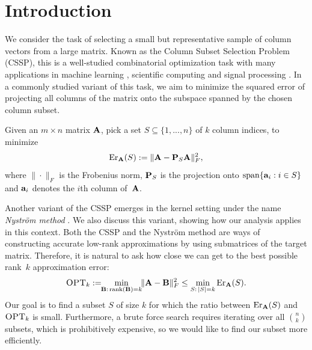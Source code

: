 \documentclass{article}
\begin{document}
\section{Introduction}
\label{s:intro}
We consider the task of selecting a small but representative sample of
column vectors from a large matrix. Known as the Column Subset Selection
Problem (CSSP), this is a well-studied combinatorial optimization task with
many applications in machine learning  
\citep[e.g., feature selection, see][]{Guyon03FeatureSelection,BoutsidisMD08},
scientific computing \citep[e.g.,][]{Chan92RankRevealingQR,Drineas08CUR} and signal processing
\citep[e.g.,][]{Balzano10MatchedSubspace}. In a 
commonly studied variant of this task, we aim to minimize the
squared error of projecting all columns of the matrix onto the
subspace spanned by the chosen column subset.
\begin{definition}[CSSP]
  Given an $m\times n$ matrix $\A$, pick a set $S\subseteq\{1,...,n\}$ of 
  $k$ column indices, to minimize
  \begin{align*}
   \Er_\A(S) := \|\A - \P_S\A\|_F^2,
  \end{align*}
  where $\|\cdot\|_F$ is the Frobenius norm, $\P_S$ is the
  projection onto $\mathrm{span}\{\a_i:i\in S\}$ and $\a_i$ denotes the $i$th
  column of~$\A$.
\end{definition}
Another variant of the CSSP emerges in the kernel
setting under the name \emph{Nystr\"om method}
\citep{Williams01Nystrom,dm_kernel_JRNL,revisiting-nystrom}. We also
discuss this variant, showing how our analysis applies in this context.
Both the CSSP and the Nystr\"om method are ways of
constructing accurate low-rank approximations by using submatrices of
the target matrix. Therefore, it is natural to ask how
close we can get to the best possible rank~$k$ approximation error:
\begin{align*}
  \opt := \!\!\min_{\B:\,\rank(\B)=k} \!\!\|\A-\B\|_F^2\leq \min_{S:\,|S|=k}\Er_\A(S).
\end{align*}
Our goal is to find a subset $S$ of size $k$ for which the ratio
between $\Er_\A(S)$ and $\opt$ is small. Furthermore, a brute force
search requires iterating over all 
${n \choose k}$ subsets, which is prohibitively expensive, so we
would like to find our subset more efficiently.
\end{document}
